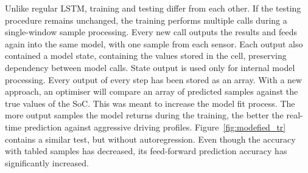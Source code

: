 Unlike regular LSTM, training and testing differ from each other.
If the testing procedure remains unchanged, the training performs multiple calls during a single-window sample processing.
Every new call outputs the results and feeds again into the same model, with one sample from each sensor.
Each output also contained a model state, containing the values stored in the cell, preserving dependency between model calls.
State output is used only for internal model processing.
Every output of every step has been stored as an array.
With a new approach, an optimiser will compare an array of predicted samples against the true values of the SoC.
This was meant to increase the model fit process.
The more output samples the model returns during the training, the better the real-time prediction against aggressive driving profiles.
\mbox{Figure~\ref{fig:modefied_tr}} contains a similar test, but without autoregression.
Even though the accuracy with tabled samples has decreased, its feed-forward prediction accuracy has significantly increased.
